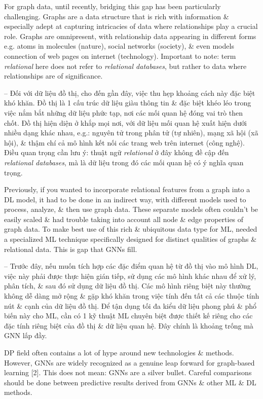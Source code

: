 \documentclass{article}
\begin{document}
\begin{itemize}
    For graph data, until recently, bridging this gap has been particularly challenging. Graphs are a data structure that is rich with information \& especially adept at capturing intricacies of data where relationships play a crucial role. Graphs are omnipresent, with relationship data appearing in different forms e.g. atoms in molecules (nature), social networks (society), \& even models connection of web pages on internet (technology). Important to note: term {\it relational} here does not refer to {\it relational databases}, but rather to data where relationships are of significance.

    -- Đối với dữ liệu đồ thị, cho đến gần đây, việc thu hẹp khoảng cách này đặc biệt khó khăn. Đồ thị là 1 cấu trúc dữ liệu giàu thông tin \& đặc biệt khéo léo trong việc nắm bắt những dữ liệu phức tạp, nơi các mối quan hệ đóng vai trò then chốt. Đồ thị hiện diện ở khắp mọi nơi, với dữ liệu mối quan hệ xuất hiện dưới nhiều dạng khác nhau, e.g.: nguyên tử trong phân tử (tự nhiên), mạng xã hội (xã hội), \& thậm chí cả mô hình kết nối các trang web trên internet (công nghệ). Điều quan trọng cần lưu ý: thuật ngữ {\it relational} ở đây không đề cập đến {\it relational databases}, mà là dữ liệu trong đó các mối quan hệ có ý nghĩa quan trọng.

    Previously, if you wanted to incorporate relational features from a graph into a DL model, it had to be done in an indirect way, with different models used to process, analyze, \& then use graph data. These separate models often couldn't be easily scaled \& had trouble taking into account all node \& edge properties of graph data. To make best use of this rich \& ubiquitous data type for ML, needed a specialized ML technique specifically designed for distinct qualities of graphs \& relational data. This is gap that GNNs fill.

    -- Trước đây, nếu muốn tích hợp các đặc điểm quan hệ từ đồ thị vào mô hình DL, việc này phải được thực hiện gián tiếp, sử dụng các mô hình khác nhau để xử lý, phân tích, \& sau đó sử dụng dữ liệu đồ thị. Các mô hình riêng biệt này thường không dễ dàng mở rộng \& gặp khó khăn trong việc tính đến tất cả các thuộc tính nút \& cạnh của dữ liệu đồ thị. Để tận dụng tối đa kiểu dữ liệu phong phú \& phổ biến này cho ML, cần có 1 kỹ thuật ML chuyên biệt được thiết kế riêng cho các đặc tính riêng biệt của đồ thị \& dữ liệu quan hệ. Đây chính là khoảng trống mà GNN lấp đầy.

    DP field often contains a lot of hype around new technologies \& methods. However, GNNs are widely recognized as a genuine leap forward for graph-based learning [2]. This does not mean: GNNs are a silver bullet. Careful comparisons should be done between predictive results derived from GNNs \& other ML \& DL methods.


\end{itemize}
\end{document}
